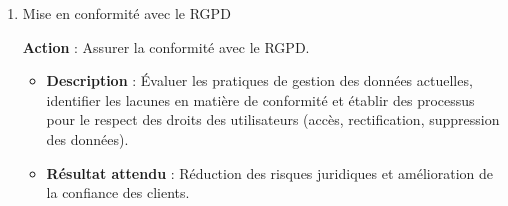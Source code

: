 \begin{enumerate}
    \item Mise en conformité avec le RGPD

        \textbf{Action} : Assurer la conformité avec le RGPD.

        \begin{itemize}
            \item \textbf{Description} : Évaluer les pratiques de gestion des données actuelles, identifier les lacunes en matière de conformité et établir des processus pour le respect des droits des utilisateurs (accès, rectification, suppression des données).
            \item \textbf{Résultat attendu} : Réduction des risques juridiques et amélioration de la confiance des clients.
        \end{itemize}

\end{enumerate}
